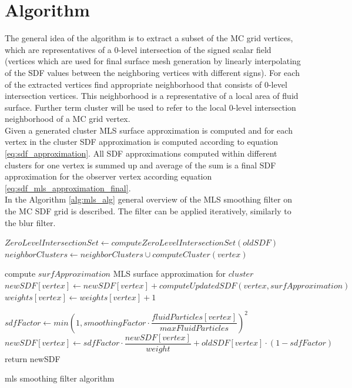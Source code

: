 \section{Algorithm}
The general idea of the algorithm is to extract a subset of the MC grid vertices, which are representatives of a 0-level intersection of the signed scalar field (vertices which are used for  final surface mesh generation by linearly interpolating of the SDF values between the neighboring vertices with different signs). For each of the extracted vertices find appropriate neighborhood that consists of 0-level intersection vertices. This neighborhood is a representative of a local area of fluid surface. Further term cluster will be used to refer to the local 0-level intersection neighborhood of a MC grid vertex.\\
Given a generated cluster MLS surface approximation is computed and for each vertex in the cluster SDF approximation is computed according to equation \ref{eq:sdf_approximation}. All SDF approximations computed within different clusters for one vertex is summed up and average of the sum is a final SDF approximation for the observer vertex according equation \ref{eq:sdf_mls_approximation_final}.\\
In the Algorithm \ref{alg:mls_alg} general overview of the MLS smoothing filter on the MC SDF grid is described. The filter can be applied iteratively, similarly to the blur filter.
\begin{algorithm}[H]
	\scriptsize
	\begin{algorithmic}
		\State $ZeroLevelIntersectionSet \gets computeZeroLevelIntersectionSet(oldSDF)$
			\State $neighborClusters \gets neighborClusters \cup computeCluster(vertex)$
		\EndFor
			
			\State compute $surfApproximation$ MLS surface approximation for $cluster$
				\State $newSDF[vertex] \gets newSDF[vertex] + computeUpdatedSDF(vertex, surfApproximation)$
				\State $weights[vertex] \gets weights[vertex] + 1$
			\EndFor
		\EndFor

			\State $sdfFactor \gets min\left(1, smoothingFactor \cdot \dfrac{fluidParticles[vertex]}{maxFluidParticles}\right)^2$
			\State $newSDF[vertex] \gets sdfFactor \cdot \dfrac{newSDF[vertex]}{weight} + oldSDF[vertex] \cdot (1 - sdfFactor)$
		\EndFor
		\State return newSDF
	\end{algorithmic}
	\caption{mls smoothing filter algorithm}
	\label{alg:mls_alg}
\end{algorithm}
